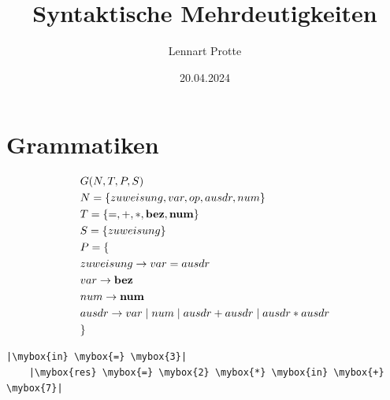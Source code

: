 \documentclass[t]{beamer}
\newcommand*{\mybox}[1]{\framebox{#1}}
\begin{document}

\title{Syntaktische Mehrdeutigkeiten}
\date{20.04.2024}
\author{Lennart Protte}
\frame{\titlepage}

\section{Grammatiken}
\begin{frame}[fragile]
\begin{align*}
    & G(N,T,P,S) \\
    & N= \{zuweisung, var, op, ausdr, num\} \\
    & T= \{=, +, *, \bold{bez}, \bold{num}\} \\
    & S= \{zuweisung\}  \\
    & P = \{ \\
    & zuweisung \rightarrow var = ausdr \\
    & var \rightarrow \bold{bez} \\
    & num \rightarrow \bold{num} \\
    & ausdr \rightarrow var \mid num \mid ausdr + ausdr \mid ausdr * ausdr \\
    & \}
\end{align*}
\begin{center}
\vspace{\fill}
\begin{lstlisting}[frame=single,escapechar=|,label={lst:lstlisting}]
    |\mybox{in} \mybox{=} \mybox{3}|
    |\mybox{res} \mybox{=} \mybox{2} \mybox{*} \mybox{in} \mybox{+} \mybox{7}|
\end{lstlisting}
\end{center}
\end{frame}
\end{document}
